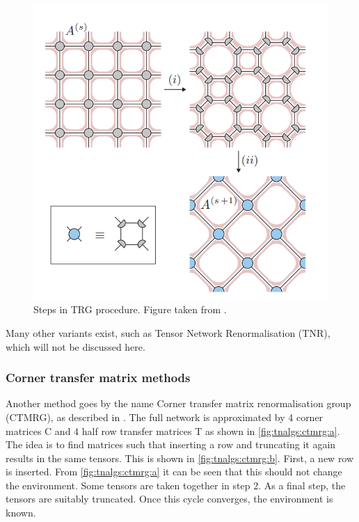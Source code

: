 \begin{figure}[H]
    \center
    \includegraphics[width=0.8 \textwidth]{Figuren/tnalgs/TRG.png}
    \caption{ Steps in TRG procedure. Figure taken from \cite{Hauru}.  }
    \label{fig:tnalgs:trg}
\end{figure}

Many other variants exist, such as Tensor Network Renormalisation (TNR), which will not be discussed here.

\subsubsection{Corner transfer matrix  methods}

Another method goes by the name Corner transfer matrix renormalisation group (CTMRG), as described in \cite{orus}. The full network is approximated by 4 corner matrices C and 4 half row transfer matrices T as shown in \cref{fig:tnalgs:ctmrg:a}. The idea is to find matrices such that inserting a row and truncating it again results in the same tensors. This is shown in \cref{fig:tnalgs:ctmrg:b}. First, a new row is inserted. From \cref{fig:tnalgs:ctmrg:a} it can be seen that this should not change the environment. Some tensors are taken together in step 2. As a final step, the tensors are suitably truncated. Once this cycle converges, the environment is known.

